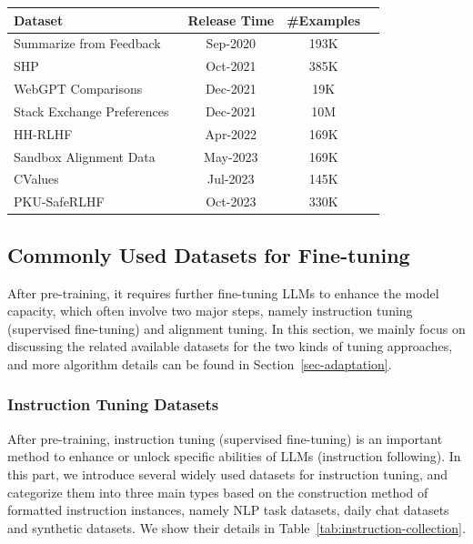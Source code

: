 {{{\begin{table}[h]
\begin{tabular}{lccc}
    \textbf{Dataset} & \textbf{Release Time} & \textbf{\#Examples} \\
    \midrule
Summarize from Feedback~\cite{Stiennon-arxiv-2020-learning}  & Sep-2020 & 193K \\
SHP~\cite{Ethayarajh-ICLM-2022-Understanding}  & Oct-2021 & 385K \\
WebGPT Comparisons~\cite{Nakano-arxiv-2021-WebGPT}    & Dec-2021 & 19K  \\
Stack Exchange Preferences~\cite{Lambert-2023-StackH4}  & Dec-2021 & 10M  \\
HH-RLHF~\cite{Bai-arxiv-2022-Training}         & Apr-2022 & 169K \\
Sandbox Alignment Data~\cite{Liu-arxiv-2023-training}      & May-2023 & 169K \\
CValues~\cite{Xu-2023-arxiv-CValues}  & Jul-2023 & 145K \\
PKU-SafeRLHF~\cite{Dai-arxiv-2023-SafeRLHF}    & Oct-2023 & 330K \\  
    \bottomrule
    \end{tabular}
    \label{tab:alignment-collection}
\end{table}

\subsection{Commonly Used Datasets for Fine-tuning}
\label{sec:commonly_used_fituning}


{After pre-training, 
it requires further fine-tuning LLMs to enhance the model capacity, which often involve two major steps, namely instruction tuning (supervised fine-tuning) and alignment tuning. In this section, we mainly focus on discussing the related available  datasets for the two kinds of tuning approaches, and more algorithm details can be found in Section~\ref{sec-adaptation}.  

\subsubsection{Instruction Tuning Datasets}
\label{sec:it-dataset}

{
After pre-training, instruction tuning (\aka supervised fine-tuning) is an important method to enhance or unlock specific abilities of LLMs (\eg instruction following). In this part, we introduce several widely used datasets for instruction tuning, and categorize them into three main types based on the construction method of formatted instruction instances, namely NLP task datasets, daily chat datasets and synthetic datasets. 
We show their details in Table~\ref{tab:instruction-collection}.}


}}}}
